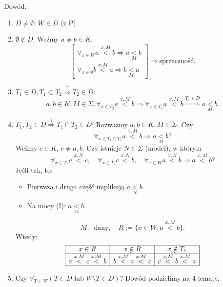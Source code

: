 \documentclass[12pt,a4paper]{article}
\theoremstyle{break}
\begin{document}
	Dowód:
	\begin{enumerate}
		\item $D \neq \emptyset$: $W \in D$ (z P).
		
		\item $\emptyset \notin D$: 
		Weźmy $a \neq b \in K$,
		\[
		\begin{bmatrix}
			\forall_{x \in W} a \overset{x,M}{<} b \Rightarrow a \underset{M}{<} b \\
			\forall_{x \in \emptyset} b \overset{x,M}{<} a \Rightarrow b \underset{M}{<} a
		\end{bmatrix}
		\Rightarrow \text{sprzeczność}.
		\]
		
		\item $T_1 \in D, T_1 \subset T_2 \overset{?}{\Rightarrow} T_2 \in D$: 
		\[
		a, b \in K, M \in \Sigma, \forall_{x \in T_2} a \overset{x,M}{<} b 
		\Rightarrow \forall_{x \in T_1} a \overset{x,M}{<} b \overset{T_1 \in D}{\Rightarrow} a \underset{M}{<} b.
		\]
		
		\item $T_1, T_2 \in D \overset{?}{\Rightarrow} T_1 \cap T_2 \in D$:
		Rozważmy $a, b \in K, M \in \Sigma$. Czy
		\[
		\forall_{x \in T_1 \cap T_2} a \overset{x,M}{<} b \Rightarrow a \underset{M}{<} b?
		\]
		Weźmy $c \in K$, $c \neq a, b$. Czy istnieje $N \in \Sigma$ (model), w którym
		\[
		\forall_{x \in T_1} a \overset{x,N}{<} c, \quad 
		\forall_{x \in T_2} c \overset{x,N}{<} b, \quad 
		\forall_{x \in W} a \overset{x,N}{<} b \Rightarrow a \overset{x,M}{<} b?
		\]
		Jeśli tak, to:
		\begin{itemize}
			\item Pierwsza i druga część implikują $a \underset{N}{<} b$.
			\item Na mocy (I): $a \underset{M}{<} b$.
		\end{itemize}
		\[
		M \text{ - dany}, \quad R := \{x \in W : a \overset{x,M}{<} b\}.
		\]
		Wtedy:
		\[
		\begin{array}{|c|c|c|}
			\hline
			x \in R & x \notin R & x \notin T_1 \\
			\hline
			a \overset{x,M}{<} c \overset{x,M}{<} b & b \overset{x,M}{<} a \overset{x,M}{<} c & c \overset{x,M}{<} b \overset{x,M}{<} a \\
			\hline
		\end{array}
		\]
		
		\item Czy $\forall_{T \subset W} (T \in D \text{ lub } W \setminus T \in D)$?
		Dowód podzielimy na 4 lematy.
	\end{enumerate}
	
\end{document}
